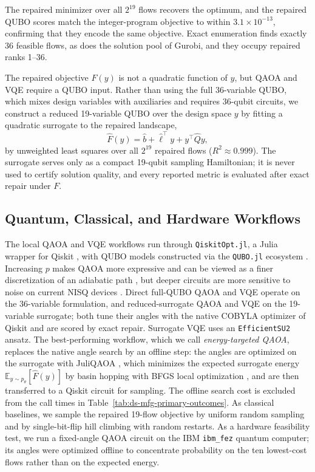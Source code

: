 \documentclass[10pt,letterpaper]{article}
\begin{document}
The repaired minimizer over all $2^{19}$ flows recovers the optimum, and the repaired QUBO scores match the integer-program objective to within $3.1\times 10^{-13}$, confirming that they encode the same objective.
Exact enumeration finds exactly 36 feasible flows, as does the solution pool of Gurobi, and they occupy repaired ranks 1--36.

The repaired objective $F(y)$ is not a quadratic function of $y$, but QAOA and VQE require a QUBO input.
Rather than using the full 36-variable QUBO, which mixes design variables with auxiliaries and requires 36-qubit circuits, we construct a reduced 19-variable QUBO over the design space $y$ by fitting a quadratic surrogate to the repaired landscape,
\begin{equation}
    \widehat{F}(y)
    =
    \widehat{b}
    + \widehat{\ell}^{\top} y
    + y^{\top} \widehat{Q} y ,
    \label{eq:ds-mfg-quadratic-surrogate}
\end{equation}
by unweighted least squares over all $2^{19}$ repaired flows ($R^2 \approx 0.999$).
The surrogate serves only as a compact 19-qubit sampling Hamiltonian; it is never used to certify solution quality, and every reported metric is evaluated after exact repair under $F$.

\subsection{Quantum, Classical, and Hardware Workflows}
\label{subsec:ds-mfg-workflows}

The local QAOA and VQE workflows run through \texttt{QiskitOpt.jl}, a Julia wrapper for Qiskit \cite{JavadiAbhari2024}, with QUBO models constructed via the \texttt{QUBO.jl} ecosystem \cite{toqubo:2023}.
Increasing $p$ makes QAOA more expressive and can be viewed as a finer discretization of an adiabatic path \cite{Farhi2000}, but deeper circuits are more sensitive to noise on current NISQ devices \cite{Preskill2018}.
Direct full-QUBO QAOA and VQE operate on the 36-variable formulation, and reduced-surrogate QAOA and VQE on the 19-variable surrogate; both tune their angles with the native COBYLA optimizer of Qiskit and are scored by exact repair.
Surrogate VQE uses an \texttt{EfficientSU2} ansatz.
The best-performing workflow, which we call \emph{energy-targeted QAOA}, replaces the native angle search by an offline step: the angles are optimized on the surrogate with JuliQAOA \cite{Golden2023JuliQAOA}, which minimizes the expected surrogate energy $\mathbb{E}_{y \sim p_\theta}[\widehat{F}(y)]$ by basin hopping with BFGS local optimization \cite{Cerezo2021}, and are then transferred to a Qiskit circuit for sampling.
The offline search cost is excluded from the call times in Table~\ref{tab:ds-mfg-primary-outcomes}.
As classical baselines, we sample the repaired 19-flow objective by uniform random sampling and by single-bit-flip hill climbing with random restarts.
As a hardware feasibility test, we run a fixed-angle QAOA circuit on the IBM \texttt{ibm\_fez} quantum computer; its angles were optimized offline to concentrate probability on the ten lowest-cost flows rather than on the expected energy.
\end{document}
